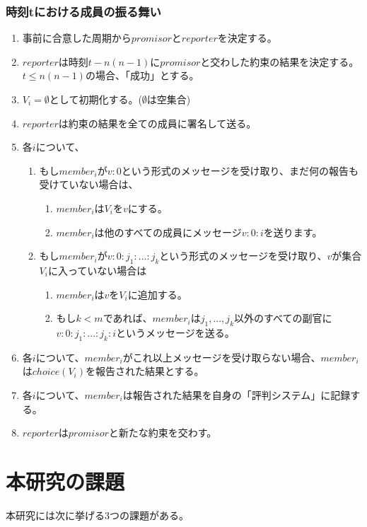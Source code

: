 \subsubsection{時刻tにおける成員の振る舞い}
\begin{enumerate}
  \item 事前に合意した周期から$promisor$と$reporter$を決定する。
  \item $reporter$は時刻$t-n(n-1)$に$promisor$と交わした約束の結果を決定する。$t \leq n(n-1)$の場合、「成功」とする。
  \item $V_i=\emptyset$として初期化する。($\emptyset$は空集合)
  \item $reporter$は約束の結果を全ての成員に署名して送る。
  \item 各$i$について、 
  \begin{enumerate}
    \item もし$member_i$が$v:0$という形式のメッセージを受け取り、まだ何の報告も受けていない場合は、
    \begin{enumerate}
      \item $member_i$は$ V_i$を${v}$にする。 
      \item $member_i$は他のすべての成員にメッセージ$v:0:i$を送ります。
    \end{enumerate}
    \item もし$member_i$が$v:0:j_1:...:j_k$という形式のメッセージを受け取り、$v$が集合$V_i$に入っていない場合は
    \begin{enumerate}
      \item $member_i$は$v$を$V_i$に追加する。
      \item もし$k<m$であれば、$member_i$は$j_1, ..., j_k$以外のすべての副官に$v:0:j_1:...:j_k:i$というメッセージを送る。
    \end{enumerate}
  \end{enumerate}
  \item 各$i$について、$member_i$がこれ以上メッセージを受け取らない場合、$member_i$は$choice(V_i)$を報告された結果とする。
  \item 各$i$について、$member_i$は報告された結果を自身の「評判システム」に記録する。
  \item $reporter$は$promisor$と新たな約束を交わす。
\end{enumerate}

\section{本研究の課題}
本研究には次に挙げる3つの課題がある。


